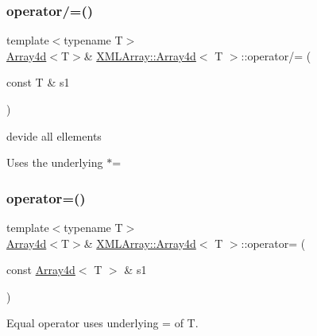 \subsubsection{\texorpdfstring{operator/=()}{operator/=()}\hspace{0.1cm}{\footnotesize\ttfamily [4/4]}}
{\footnotesize\ttfamily template$<$typename T$>$ \\
\mbox{\hyperlink{classXMLArray_1_1Array4d}{Array4d}}$<$T$>$\& \mbox{\hyperlink{classXMLArray_1_1Array4d}{X\+M\+L\+Array\+::\+Array4d}}$<$ T $>$\+::operator/= (\begin{DoxyParamCaption}\item[{const T \&}]{s1 }\end{DoxyParamCaption})\hspace{0.3cm}{\ttfamily [inline]}}



devide all ellements 

Uses the underlying $\ast$= \mbox{\label{classXMLArray_1_1Array4d_a3231647c370f838502526de102af1b23}} 
\subsubsection{\texorpdfstring{operator=()}{operator=()}\hspace{0.1cm}{\footnotesize\ttfamily [1/4]}}
{\footnotesize\ttfamily template$<$typename T$>$ \\
\mbox{\hyperlink{classXMLArray_1_1Array4d}{Array4d}}$<$T$>$\& \mbox{\hyperlink{classXMLArray_1_1Array4d}{X\+M\+L\+Array\+::\+Array4d}}$<$ T $>$\+::operator= (\begin{DoxyParamCaption}\item[{const \mbox{\hyperlink{classXMLArray_1_1Array4d}{Array4d}}$<$ T $>$ \&}]{s1 }\end{DoxyParamCaption})\hspace{0.3cm}{\ttfamily [inline]}}



Equal operator uses underlying = of T. 

\mbox{\label{classXMLArray_1_1Array4d_a3231647c370f838502526de102af1b23}} 

